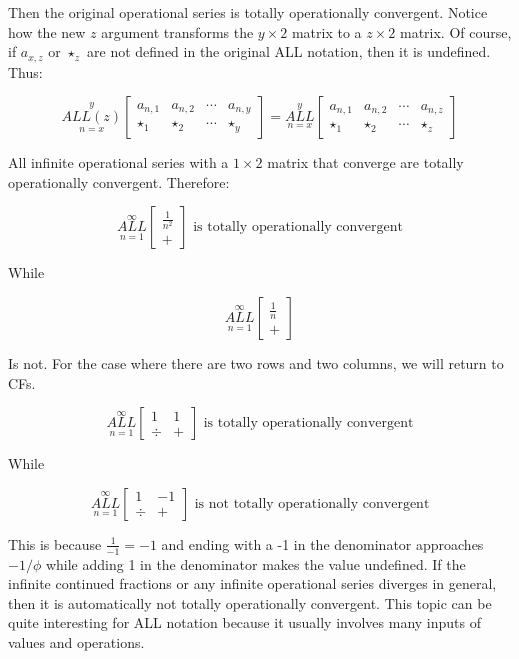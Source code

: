 \documentclass{article}
\begin{document}
Then the original operational series is totally operationally convergent. Notice how the new $z$ argument transforms the $y \times 2$ matrix to a $z \times 2$ matrix. Of course, if $a_{x,z}$ or $\star_z$ are not defined in the original ALL notation, then it is undefined. Thus:

$$\underset{n=x}{\overset{y}{ALL(z)}} \begin{bmatrix}
a_{n,1} & a_{n,2} & \cdots & a_{n,y} \\
\star_1 & \star_2 & \cdots & \star_y
\end{bmatrix} = \underset{n=x}{\overset{y}{ALL}} \begin{bmatrix}
a_{n,1} & a_{n,2} & \cdots & a_{n,z} \\
\star_1 & \star_2 & \cdots & \star_z
\end{bmatrix}$$

All infinite operational series with a $1 \times 2$ matrix that converge are totally operationally convergent. Therefore:

$$\underset{n=1}{\overset{\infty}{ALL}} \begin{bmatrix}
\frac{1}{n^2} \\
+
\end{bmatrix} \text{ is totally operationally convergent}
$$

While

$$\underset{n=1}{\overset{\infty}{ALL}} \begin{bmatrix}
\frac{1}{n} \\
+
\end{bmatrix}$$

Is not. For the case where there are two rows and two columns, we will return to CFs.

$$\underset{n=1}{\overset{\infty}{ALL}} \begin{bmatrix}
1 & 1 \\
\div & +
\end{bmatrix} \text{ is totally operationally convergent}$$

While

$$\underset{n=1}{\overset{\infty}{ALL}} \begin{bmatrix}
1 & -1 \\
\div & +
\end{bmatrix} \text{ is not totally operationally convergent}$$

This is because $\frac{1}{-1}=-1$ and ending with a -1 in the denominator approaches $-1/\phi$ while adding 1 in the denominator makes the value undefined. If the infinite continued fractions or any infinite operational series diverges in general, then it is automatically not totally operationally convergent. This topic can be quite interesting for ALL notation because it usually involves many inputs of values and operations.
\end{document}

